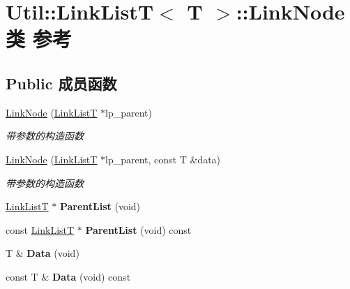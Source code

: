 \hypertarget{class_util_1_1_link_list_t_1_1_link_node}{\section{Util\-:\-:Link\-List\-T$<$ T $>$\-:\-:Link\-Node类 参考}
\label{class_util_1_1_link_list_t_1_1_link_node}
}
\subsection*{Public 成员函数}
\begin{DoxyCompactItemize}
\item 
\hyperlink{class_util_1_1_link_list_t_1_1_link_node_a1981d74b31a5018771cbf4e01c2703c4}{Link\-Node} (\hyperlink{class_util_1_1_link_list_t}{Link\-List\-T} $\ast$lp\-\_\-parent)
\begin{DoxyCompactList}\small\item\em 带参数的构造函数 \end{DoxyCompactList}\item 
\hyperlink{class_util_1_1_link_list_t_1_1_link_node_ae06b4fe4d1dc118ad48d5f7569a603c3}{Link\-Node} (\hyperlink{class_util_1_1_link_list_t}{Link\-List\-T} $\ast$lp\-\_\-parent, const T \&data)
\begin{DoxyCompactList}\small\item\em 带参数的构造函数 \end{DoxyCompactList}\item 
\hypertarget{class_util_1_1_link_list_t_1_1_link_node_a290bc81dcb5ecd6037ed22efb99726fe}{\hyperlink{class_util_1_1_link_list_t}{Link\-List\-T} $\ast$ {\bfseries Parent\-List} (void)}\label{class_util_1_1_link_list_t_1_1_link_node_a290bc81dcb5ecd6037ed22efb99726fe}

\item 
\hypertarget{class_util_1_1_link_list_t_1_1_link_node_a6b4aff6c80415c34125ff09055848a51}{const \hyperlink{class_util_1_1_link_list_t}{Link\-List\-T} $\ast$ {\bfseries Parent\-List} (void) const }\label{class_util_1_1_link_list_t_1_1_link_node_a6b4aff6c80415c34125ff09055848a51}

\item 
\hypertarget{class_util_1_1_link_list_t_1_1_link_node_aa9ce303d0ea74d40d9b7cf82f94aa53b}{T \& {\bfseries Data} (void)}\label{class_util_1_1_link_list_t_1_1_link_node_aa9ce303d0ea74d40d9b7cf82f94aa53b}

\item 
\hypertarget{class_util_1_1_link_list_t_1_1_link_node_af3b17e1cf4c555c1645b2a8ed73a1977}{const T \& {\bfseries Data} (void) const }\label{class_util_1_1_link_list_t_1_1_link_node_af3b17e1cf4c555c1645b2a8ed73a1977}


\end{DoxyCompactItemize}
